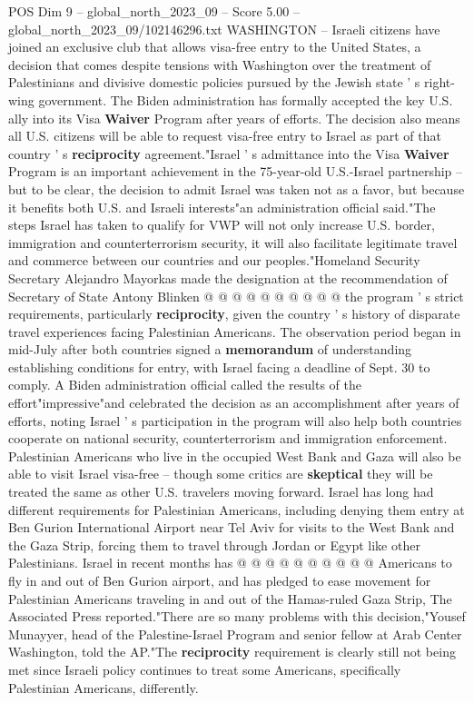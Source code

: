 \begin{textsample}{POS Dim 9 – global\_north\_2023\_09 – Score 5.00 – global\_north\_2023\_09/102146296.txt}  \label{ex:f9_pos_005}
WASHINGTON -- Israeli citizens have joined an exclusive club that allows visa-free entry to the United States, a decision that comes despite tensions with Washington over the treatment of Palestinians and divisive domestic policies pursued by the Jewish state ' s right-wing government.
The Biden administration has formally accepted the key U.S. ally into its Visa \textbf{Waiver} Program after years of efforts.
The decision also means all U.S. citizens will be able to request visa-free entry to Israel as part of that country ' s \textbf{reciprocity} agreement."Israel ' s admittance into the Visa \textbf{Waiver} Program is an important achievement in the 75-year-old U.S.-Israel partnership -- but to be clear, the decision to admit Israel was taken not as a favor, but because it benefits both U.S. and Israeli interests"an administration official said."The steps Israel has taken to qualify for VWP will not only increase U.S. border, immigration and counterterrorism security, it will also facilitate legitimate travel and commerce between our countries and our peoples."Homeland Security Secretary Alejandro Mayorkas made the designation at the recommendation of Secretary of State Antony Blinken @ @ @ @ @ @ @ @ @ @ the program ' s strict requirements, particularly \textbf{reciprocity}, given the country ' s history of disparate travel experiences facing Palestinian Americans.
The observation period began in mid-July after both countries signed a \textbf{memorandum} of understanding establishing conditions for entry, with Israel facing a deadline of Sept. 30 to comply.
A Biden administration official called the results of the effort"impressive"and celebrated the decision as an accomplishment after years of efforts, noting Israel ' s participation in the program will also help both countries cooperate on national security, counterterrorism and immigration enforcement.
Palestinian Americans who live in the occupied West Bank and Gaza will also be able to visit Israel visa-free -- though some critics are \textbf{skeptical} they will be treated the same as other U.S. travelers moving forward.
Israel has long had different requirements for Palestinian Americans, including denying them entry at Ben Gurion International Airport near Tel Aviv for visits to the West Bank and the Gaza Strip, forcing them to travel through Jordan or Egypt like other Palestinians.
Israel in recent months has @ @ @ @ @ @ @ @ @ @ Americans to fly in and out of Ben Gurion airport, and has pledged to ease movement for Palestinian Americans traveling in and out of the Hamas-ruled Gaza Strip, The Associated Press reported."There are so many problems with this decision,"Yousef Munayyer, head of the Palestine-Israel Program and senior fellow at Arab Center Washington, told the AP."The \textbf{reciprocity} requirement is clearly still not being met since Israeli policy continues to treat some Americans, specifically Palestinian Americans, differently.

\end{textsample}
